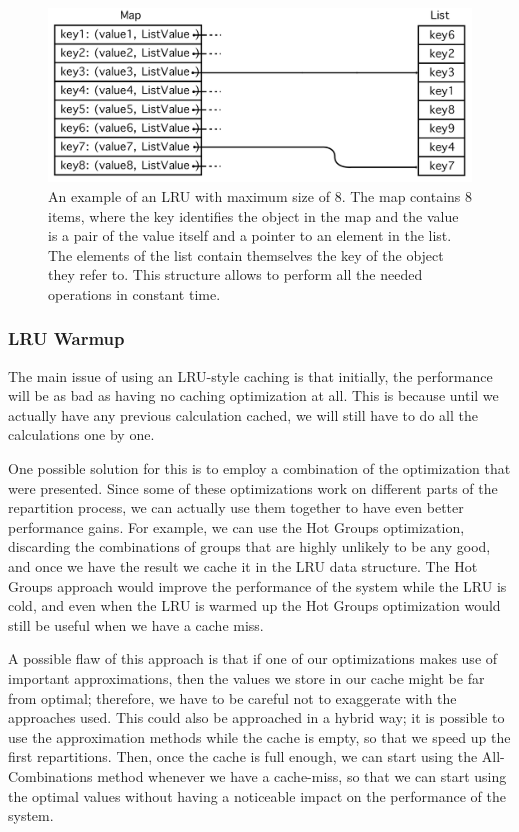 \begin{figure}[!htb]
  \centering
  \includegraphics[width=\textwidth,height=\textheight,keepaspectratio]{img/lru.png}
  \caption[caption]{An example of an LRU with maximum size of 8. The map contains 8 items, where the key identifies the object in the map and the value is a pair of the value itself and a pointer to an element in the list. The elements of the list contain themselves the key of the object they refer to. This structure allows to perform all the needed operations in constant time. }
  \label{fig:lru}
\end{figure}

\subsubsection{LRU Warmup}\label{sec:warmup}
The main issue of using an LRU-style caching is that initially, the performance will be as bad as having no caching optimization at all. This is because until we actually have any previous calculation cached, we will still have to do all the calculations one by one. 

One possible solution for this is to employ a combination of the optimization that were presented. Since some of these optimizations work on different parts of the repartition process, we can actually use them together to have even better performance gains. For example, we can use the Hot Groups optimization, discarding the combinations of groups that are highly unlikely to be any good, and once we have the result we cache it in the LRU data structure. The Hot Groups approach would improve the performance of the system while the LRU is cold, and even when the LRU is warmed up the Hot Groups optimization would still be useful when we have a cache miss.

A possible flaw of this approach is that if one of our optimizations makes use of important approximations, then the values we store in our cache might be far from optimal; therefore, we have to be careful not to exaggerate with the approaches used. This could also be approached in a hybrid way; it is possible to use the approximation methods while the cache is empty, so that we speed up the first repartitions. Then, once the cache is full enough, we can start using the All-Combinations method whenever we have a cache-miss, so that we can start using the optimal values without having a noticeable impact on the performance of the system.

